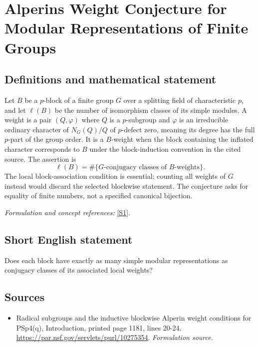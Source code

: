 \documentclass[11pt]{article}
\begin{document}
\section*{\texorpdfstring{Alperins Weight Conjecture for Modular Representations of Finite Groups}{Alperins Weight Conjecture for Modular Representations of Finite Groups}}\label{342}
\subsection{Definitions and mathematical statement}
Let $B$ be a $p$-block of a finite group $G$ over a splitting field of characteristic $p$, and let $\ell(B)$ be the number of isomorphism classes of its simple modules. A weight is a pair $(Q,\varphi)$ where $Q$ is a $p$-subgroup and $\varphi$ is an irreducible ordinary character of $N_G(Q)/Q$ of $p$-defect zero, meaning its degree has the full $p$-part of the group order. It is a $B$-weight when the block containing the inflated character corresponds to $B$ under the block-induction convention in the cited source. The assertion is
\[
 \ell(B)=\#\{G\text{-conjugacy classes of }B\text{-weights}\}.
\]
The local block-association condition is essential; counting all weights of $G$ instead would discard the selected blockwise statement. The conjecture asks for equality of finite numbers, not a specified canonical bijection.
\par\smallskip\textit{Formulation and concept references:} \href{https://par.nsf.gov/servlets/purl/10275354}{[S1]}.

\subsection{Short English statement}
Does each block have exactly as many simple modular representations as conjugacy classes of its associated local weights?
\subsection{Sources}
\begin{itemize}
\item[S1]Radical subgroups and the inductive blockwise Alperin weight conditions for PSp4(q), Introduction, printed page 1181, lines 20-24.
\url{https://par.nsf.gov/servlets/purl/10275354}.
\textit{Formulation source.}
\end{itemize}
\end{document}
